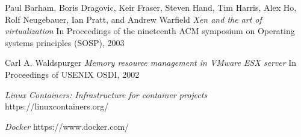\documentclass[a4paper, 10pt,twocolumn]{article}
\begin{document}
\begin{thebibliography}{25}
Paul Barham, Boris Dragovic, Keir Fraser, Steven Hand, Tim Harris, Alex Ho, Rolf Neugebauer, Ian Pratt, and Andrew Warfield
\textit{Xen and the art of virtualization}
In Proceedings of the nineteenth ACM symposium on Operating systems principles (SOSP), 2003

Carl A. Waldspurger
\textit{Memory resource management in VMware ESX server}
In Proceedings of USENIX OSDI, 2002


\textit{Linux Containers: Infrastructure for container projects}
https://linuxcontainers.org/


\textit{Docker}
https://www.docker.com/

\end{thebibliography}
\end{document}
